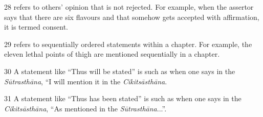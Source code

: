 \begin{translation}
\item [28]  refers to others' opinion that is not rejected. For example, when the assertor says that there are six flavours and that somehow gets accepted with affirmation, it is termed consent.

\item [29]  refers to sequentially ordered statements within a chapter. For example, the eleven lethal points of thigh are mentioned sequentially in a chapter.

\item [30] A statement like “Thus will be stated” is  such as when one says in the \emph{Sūtrasthāna}, “I will mention it in the \emph{Cikitsāsthāna}. 

\item [31] A statement like “Thus has been stated” is  such as when one says in the \emph{Cikitsāsthāna}, ``As mentioned in the \emph{Sūtrasthāna}...''. 

\end{translation}
